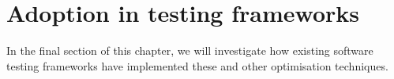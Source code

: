 
\section{Adoption in testing frameworks}
In the final section of this chapter, we will investigate how existing software testing frameworks have implemented these and other optimisation techniques.



